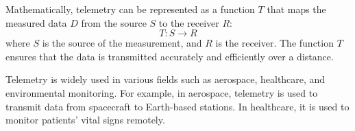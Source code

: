 Mathematically, telemetry can be represented as a function \( T \) that maps the measured data \( D \) from the source \( S \) to the receiver \( R \):
\[
T: S \rightarrow R
\]
where \( S \) is the source of the measurement, and \( R \) is the receiver. The function \( T \) ensures that the data is transmitted accurately and efficiently over a distance.

Telemetry is widely used in various fields such as aerospace, healthcare, and environmental monitoring. For example, in aerospace, telemetry is used to transmit data from spacecraft to Earth-based stations. In healthcare, it is used to monitor patients' vital signs remotely.

